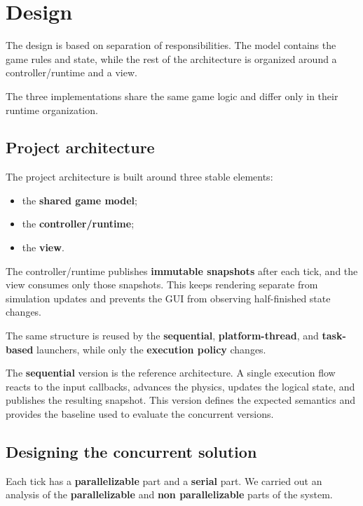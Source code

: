 \clearpage
\section{Design}

\noindent
The design is based on separation of responsibilities. The model contains the game rules and state, while the rest of the architecture is organized around a controller/runtime and a view.

The three implementations share the same game logic and differ only in their runtime organization.

\subsection{Project architecture}

The project architecture is built around three stable elements:

\begin{itemize}
    \item the \textbf{shared game model};
    \item the \textbf{controller/runtime};
    \item the \textbf{view}.
\end{itemize}

The controller/runtime publishes \textbf{immutable snapshots} after each tick, and the view consumes only those snapshots. This keeps rendering separate from simulation updates and prevents the GUI from observing half-finished state changes.

The same structure is reused by the \textbf{sequential}, \textbf{platform-thread}, and \textbf{task-based} launchers, while only the \textbf{execution policy} changes.

The \textbf{sequential} version is the reference architecture. A single execution flow reacts to the input callbacks, advances the physics, updates the logical state, and publishes the resulting snapshot. This version defines the expected semantics and provides the baseline used to evaluate the concurrent versions.

\subsection{Designing the concurrent solution}

Each tick has a \textbf{parallelizable} part and a \textbf{serial} part. We carried out an analysis of the \textbf{parallelizable} and \textbf{non parallelizable} parts of the system.

